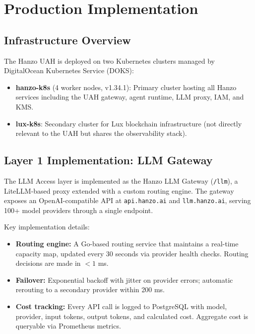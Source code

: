 \section{Production Implementation}

\label{sec:implementation}

\subsection{Infrastructure Overview}

The Hanzo UAH is deployed on two Kubernetes clusters managed by DigitalOcean
Kubernetes Service (DOKS):

\begin{itemize}[leftmargin=1.5em]
    \item \textbf{hanzo-k8s} (4 worker nodes, v1.34.1):
          Primary cluster hosting all Hanzo services including the UAH
          gateway, agent runtime, LLM proxy, IAM, and KMS.
    \item \textbf{lux-k8s}:
          Secondary cluster for Lux blockchain infrastructure (not directly
          relevant to the UAH but shares the observability stack).
\end{itemize}

\subsection{Layer 1 Implementation: LLM Gateway}

The LLM Access layer is implemented as the Hanzo LLM Gateway
(\texttt{/llm}), a LiteLLM-based proxy extended with a custom routing engine.
The gateway exposes an OpenAI-compatible API at \texttt{api.hanzo.ai} and
\texttt{llm.hanzo.ai}, serving 100+ model providers through a single
endpoint.

Key implementation details:
\begin{itemize}[leftmargin=1.5em]
    \item \textbf{Routing engine:} A Go-based routing service that maintains
          a real-time capacity map, updated every 30 seconds via provider
          health checks. Routing decisions are made in $<1$ ms.
    \item \textbf{Failover:} Exponential backoff with jitter on provider
          errors; automatic rerouting to a secondary provider within 200 ms.
    \item \textbf{Cost tracking:} Every API call is logged to PostgreSQL with
          model, provider, input tokens, output tokens, and calculated cost.
          Aggregate cost is queryable via Prometheus metrics.
\end{itemize}

